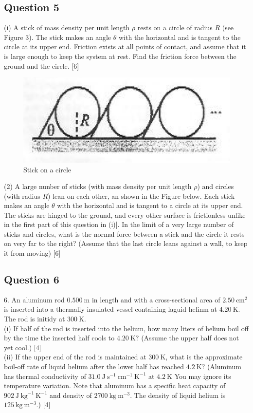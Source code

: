 \documentclass{article}
\begin{document}
\subsection{Question 5}

(i) A stick of mass density per unit length $\rho$ rests on a circle of radius $R$ (see Figure 3). The stick makes an angle $\theta$ with the horizontal and is tangent to the circle at its upper end. Friction exists at all points of contact, and assume that it is large enough to keep the system at rest. Find the friction force between the ground and the circle. [6]

\begin{figure}
	\centering
	\includegraphics[width=0.7\linewidth]{spho_book_TYS_images/2011q5.png}
	\caption{Stick on a circle}
\end{figure}
(2) A large nunber of sticks (with mass density per unit length $\rho$) and circles (with radius $R$) lean on each other, an shown in the Figure below. Each stick makes an angle $\theta$ with the horizontal and is tangent to a circle at its upper end. The sticks are hinged to the ground, and every other surface is frictionless unlike in the first part of this question in (i)]. In the limit of a very large number of sticks and circles, what is the normal force between a stick and the circle it rests on very far to the right? (Assume that the last circle leans against a wall, to keep it from moving) [6]



\subsection{Question 6}
6. An aluminum rod $0.500 \mathrm{~m}$ in length and with a cross-sectional area of $2.50 \mathrm{~cm}^{2}$ is inserted into a thermally insulated vessel containing laguid helinm at $4.20 \mathrm{~K}$. The rod is initidy at $300 \mathrm{~K}$. \\
(i) If half of the rod is inserted into the helium, how many liters of helium boil off by the time the inserted half cools to $4.20 \mathrm{~K} ?$ (Assume the upper half does not yet cool.) [4] \\
(ii) If the upper end of the rod is maintained at $300 \mathrm{~K}$, what is the approximate boil-off rate of liquid helium after the lower half has reached $4.2 \mathrm{~K} ?$ (Aluminum has thermal conductivity of $31.0 \mathrm{~J} \mathrm{~s}^{-1} \mathrm{~cm}^{-1} \mathrm{~K}^{-1}$ at $4.2 \mathrm{~K}$ You may ignore its temperature variation. Note that aluminum has a specific heat capacity of $902 \mathrm{~J~kg}^{-1} \mathrm{~K}^{-1}$ and density of $2700 \mathrm{~kg} \mathrm{~m}^{-3}$. The density of liquid helium is $125 \mathrm{~kg} \mathrm{~m}^{-3}$.) [4] \\
\end{document}
